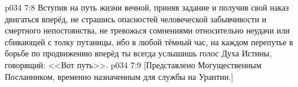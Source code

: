 \vs p034 7:8 \pc Вступив на путь жизни вечной, приняв задание и получив свой наказ двигаться вперёд, не страшись опасностей человеческой забывчивости и смертного непостоянства, не тревожься сомнениями относительно неудачи или сбивающей с толку путаницы, ибо в любой тёмный час, на каждом перепутье в борьбе по продвижению вперёд ты всегда услышишь голос Духа Истины, говорящий: <<Вот путь>>.
\vsetoff 
\vs p034 7:9 [Представлено Могущественным Посланником, временно назначенным для службы на Урантии.]
\quizlink
